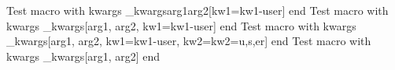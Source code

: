 \documentclass{article}
\author{Macro Kwarg Test}
\begin{document}
	Test macro with kwargs \pym\macro_kwargs{arg1}{arg2}[kw1=kw1-user] end
	Test macro with kwargs \pym\macro_kwargs[arg1, arg2, kw1=kw1-user] end
	Test macro with kwargs \pym\macro_kwargs[arg1, arg2, kw1=kw1-user, kw2={kw2=u,s,er}] end
	Test macro with kwargs \pym\macro_kwargs[arg1, arg2] end
\end{document}
